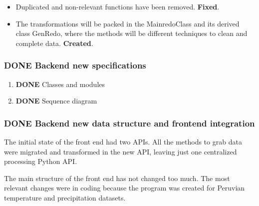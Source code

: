 \documentclass[a4paper]{article}
\begin{document}
\begin{itemize}
\item Duplicated and non-relevant functions have been removed. \textbf{Fixed}.

\item The transformations will be packed in the MainredoClass and its derived class GenRedo, where the methods will be different techniques to clean and complete data. \textbf{Created}.
\end{itemize}

\sffamily \footnotesize
\begin{center}

\end{center}
\rmfamily \normalsize

\subsubsection{{\bfseries\sffamily DONE} Backend new specifications}
\label{sec:org36036ef}

\begin{enumerate}
\item {\bfseries\sffamily DONE} Classes and modules
\label{sec:org48ae754}

\sffamily \footnotesize
\begin{center}

\end{center}
\rmfamily \normalsize

\item {\bfseries\sffamily DONE} Sequence diagram
\label{sec:org6cbe650}

\sffamily \scriptsize
\begin{center}

\end{center}
\rmfamily \normalsize
\end{enumerate}

\subsubsection{{\bfseries\sffamily DONE} Backend new data structure and frontend integration}
\label{sec:orgbbc0a3f}

The initial state of the front end had two APIs. All the methods to grab data were migrated and transformed in the new API, leaving just one centralized processing Python API.

The main structure of the front end has not changed too much. The most relevant changes were in coding because the program was created for Peruvian temperature and precipitation datasets.
\end{document}

